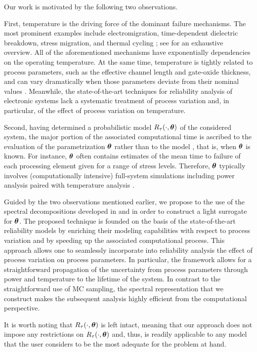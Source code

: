 Our work is motivated by the following two observations.

First, temperature is the driving force of the dominant failure mechanisms.
The most prominent examples include electromigration, time-dependent dielectric breakdown, stress migration, and thermal cycling \cite{xiang2010}; see \cite{jedec2011} for an exhaustive overview.
All of the aforementioned mechanisms have exponentially dependencies on the operating temperature.
At the same time, temperature is tightly related to process parameters, such as the effective channel length and gate-oxide thickness, and can vary dramatically when those parameters deviate from their nominal values \cite{ukhov2014, juan2012}.
Meanwhile, the state-of-the-art techniques for reliability analysis of electronic systems lack a systematic treatment of process variation and, in particular, of the effect of process variation on temperature.

Second, having determined a probabilistic model $R_\tau(\cdot, \bm{\theta})$ of the considered system, the major portion of the associated computational time is ascribed to the evaluation of the parametrization $\bm{\theta}$ rather than to the model \perse, that is, when $\bm{\theta}$ is known.
For instance, $\bm{\theta}$ often contains estimates of the mean time to failure of each processing element given for a range of stress levels.
Therefore, $\bm{\theta}$ typically involves (computationally intensive) full-system simulations including power analysis paired with temperature analysis \cite{xiang2010}.

Guided by the two observations mentioned earlier, we propose to the use of the spectral decompositions developed in  and  in order to construct a light surrogate for $\bm{\theta}$.
The proposed technique is founded on the basis of the state-of-the-art reliability models by enriching their modeling capabilities with respect to process variation and by speeding up the associated computational process.
This approach allows one to seamlessly incorporate into reliability analysis the effect of process variation on process parameters.
In particular, the framework allows for a straightforward propagation of the uncertainty from process parameters through power and temperature to the lifetime of the system.
In contrast to the straightforward use of MC sampling, the spectral representation that we construct makes the subsequent analysis highly efficient from the computational perspective.

It is worth noting that $R_\tau(\cdot, \bm{\theta})$ is left intact, meaning that our approach does not impose any restrictions on $R_\tau(\cdot, \bm{\theta})$ and, thus, is readily applicable to any model that the user considers to be the most adequate for the problem at hand.
